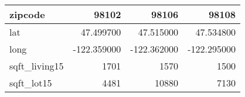 \begin{table}[H]
\begin{tabular}{|l|r|r|r|}
\hline zipcode & \cellcolor[rgb]{0.9, 0.54, 0.52} 98102 & 98106 & 98108 \\
\hline lat & \cellcolor[rgb]{0.9, 0.54, 0.52} 47.499700 & 47.515000 & 47.534800 \\
\hline long & \cellcolor[rgb]{0.9, 0.54, 0.52} -122.359000 & \cellcolor[rgb]{0.9, 0.54, 0.52} -122.362000 & \cellcolor[rgb]{0.9, 0.54, 0.52} -122.295000 \\
\hline sqft\_living15 & \cellcolor[rgb]{0.9, 0.54, 0.52} 1701 & 1570 & 1500 \\
\hline sqft\_lot15 & \cellcolor[rgb]{0.9, 0.54, 0.52} 4481 & 10880 & 7130 \\
\hline
\end{tabular}
\end{table}
